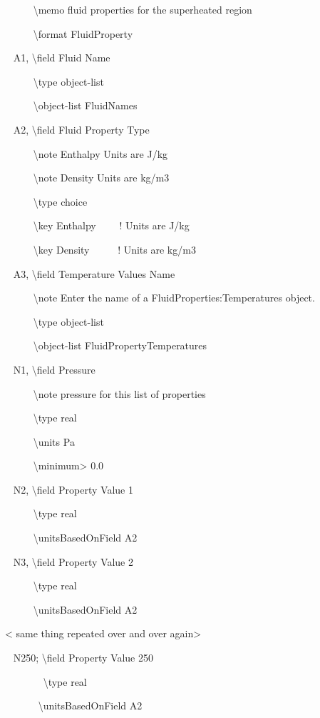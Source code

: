 ~~~~~ \textbackslash{}memo fluid properties for the superheated region

~~~~~ \textbackslash{}format FluidProperty

~ A1, \textbackslash{}field Fluid Name

~~~~~ \textbackslash{}type object-list

~~~~~ \textbackslash{}object-list FluidNames

~ A2, \textbackslash{}field Fluid Property Type

~~~~~ \textbackslash{}note Enthalpy Units are J/kg

~~~~~ \textbackslash{}note Density Units are kg/m3

~~~~~ \textbackslash{}type choice

~~~~~ \textbackslash{}key Enthalpy~~~~ ! Units are J/kg

~~~~~ \textbackslash{}key Density~~~~~ ! Units are kg/m3

~ A3, \textbackslash{}field Temperature Values Name

~~~~~ \textbackslash{}note Enter the name of a FluidProperties:Temperatures object.

~~~~~ \textbackslash{}type object-list

~~~~~ \textbackslash{}object-list FluidPropertyTemperatures

~ N1, \textbackslash{}field Pressure

~~~~~ \textbackslash{}note pressure for this list of properties

~~~~~ \textbackslash{}type real

~~~~~ \textbackslash{}units Pa

~~~~~ \textbackslash{}minimum\textgreater{} 0.0

~ N2, \textbackslash{}field Property Value 1

~~~~~ \textbackslash{}type real

~~~~~ \textbackslash{}unitsBasedOnField A2

~ N3, \textbackslash{}field Property Value 2

~~~~~ \textbackslash{}type real

~~~~~ \textbackslash{}unitsBasedOnField A2

\textless{} same thing repeated over and over again\textgreater{}

~ N250; \textbackslash{}field Property Value 250

~~~~~~~ \textbackslash{}type real

~~~~~~ \textbackslash{}unitsBasedOnField A2


